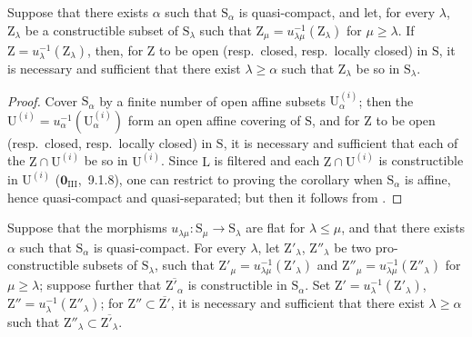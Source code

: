 \begin{corollary}[8.3.12]
\label{IV.8.3.12}
Suppose that there exists $\alpha$ such that $\mathrm{S}_\alpha$ is quasi-compact, and let, for every $\lambda$, $\mathrm{Z}_\lambda$ be a constructible subset of $\mathrm{S}_\lambda$ such that $\mathrm{Z}_\mu=u_{\lambda\mu}^{-1}(\mathrm{Z}_\lambda)$ for $\mu\geqslant\lambda$.
If $\mathrm{Z}=u_\lambda^{-1}(\mathrm{Z}_\lambda)$,
then, for $\mathrm{Z}$ to be open (resp.\ closed, resp.\ locally closed) in $\mathrm{S}$, it is necessary and sufficient that there exist $\lambda\geqslant\alpha$ such that $\mathrm{Z}_\lambda$ be so in $\mathrm{S}_\lambda$.
\end{corollary}

\begin{proof}
Cover $\mathrm{S}_\alpha$ by a finite number of open affine subsets $\mathrm{U}_\alpha^{(i)}$; then the $\mathrm{U}^{(i)}=u_\alpha^{-1}(\mathrm{U}_\alpha^{(i)})$ form an open affine covering of $\mathrm{S}$, and for $\mathrm{Z}$ to be open (resp.\ closed, resp.\ locally closed) in $\mathrm{S}$, it is necessary and sufficient that each of the $\mathrm{Z}\cap\mathrm{U}^{(i)}$ be so in $\mathrm{U}^{(i)}$.
Since $\mathrm{L}$ is filtered and each $\mathrm{Z}\cap\mathrm{U}^{(i)}$ is constructible in $\mathrm{U}^{(i)}$ ($\mathbf{0}_{\mathrm{III}}$,~9.1.8), one can restrict to proving the corollary when $\mathrm{S}_\alpha$ is affine, hence quasi-compact and quasi-separated; but then it follows from .
\end{proof}

\begin{proposition}[8.3.13]
\label{IV.8.3.13}
Suppose that the morphisms $u_{\lambda\mu}:\mathrm{S}_\mu\to\mathrm{S}_\lambda$ are flat for $\lambda\leqslant\mu$, and that there exists $\alpha$ such that $\mathrm{S}_\alpha$ is quasi-compact.
For every $\lambda$, let $\mathrm{Z}'_\lambda$, $\mathrm{Z}''_\lambda$ be two pro-constructible subsets of $\mathrm{S}_\lambda$, such that $\mathrm{Z}'_\mu=u_{\lambda\mu}^{-1}(\mathrm{Z}'_\lambda)$ and $\mathrm{Z}''_\mu=u_{\lambda\mu}^{-1}(\mathrm{Z}''_\lambda)$ for $\mu\geqslant\lambda$; suppose further that $\overline{\mathrm{Z}'_\alpha}$ is constructible in $\mathrm{S}_\alpha$.
Set $\mathrm{Z}'=u_\lambda^{-1}(\mathrm{Z}'_\lambda)$, $\mathrm{Z}''=u_\lambda^{-1}(\mathrm{Z}''_\lambda)$; for $\mathrm{Z}''\subset\overline{\mathrm{Z}'}$, it is necessary and sufficient that there exist $\lambda\geqslant\alpha$ such that $\mathrm{Z}''_\lambda\subset\overline{\mathrm{Z}'_\lambda}$.
\end{proposition}

